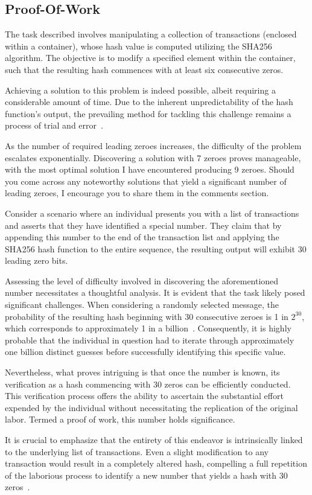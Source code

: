 \subsection{Proof-Of-Work}
The task described involves manipulating a collection of transactions (enclosed within a container), whose hash value is computed utilizing
the SHA256 algorithm. The objective is to modify a specified element within the container, such that the resulting hash commences with at
least six consecutive zeros.

Achieving a solution to this problem is indeed possible, albeit requiring a considerable amount of time. Due to the inherent unpredictability
of the hash function's output, the prevailing method for tackling this challenge remains a process of trial and error~\cite{Dworkin2001}.

As the number of required leading zeroes increases, the difficulty of the problem escalates exponentially. Discovering a solution with 7
zeroes proves manageable, with the most optimal solution I have encountered producing 9 zeroes. Should you come across any noteworthy
solutions that yield a significant number of leading zeroes, I encourage you to share them in the comments section.

Consider a scenario where an individual presents you with a list of transactions and asserts that they have identified a special number.
They claim that by appending this number to the end of the transaction list and applying the SHA256 hash function to the entire sequence,
the resulting output will exhibit 30 leading zero bits.

Assessing the level of difficulty involved in discovering the aforementioned number necessitates a thoughtful analysis. It is evident that
the task likely posed significant challenges. When considering a randomly selected message, the probability of the resulting hash beginning
with 30 consecutive zeroes is 1 in $2^{30}$, which corresponds to approximately 1 in a billion~\cite{Dworkin2001}. Consequently, it is highly
probable that the individual in question had to iterate through approximately one billion distinct guesses before successfully identifying
this specific value.

%

Nevertheless, what proves intriguing is that once the number is known, its verification as a hash commencing with 30 zeros can be efficiently
conducted. This verification process offers the ability to ascertain the substantial effort expended by the individual without necessitating
the replication of the original labor. Termed a proof of work, this number holds significance.

It is crucial to emphasize that the entirety of this endeavor is intrinsically linked to the underlying list of transactions. Even a slight
modification to any transaction would result in a completely altered hash, compelling a full repetition of the laborious process to identify
a new number that yields a hash with 30 zeros~\cite{nakamoto2008bitcoin}.
